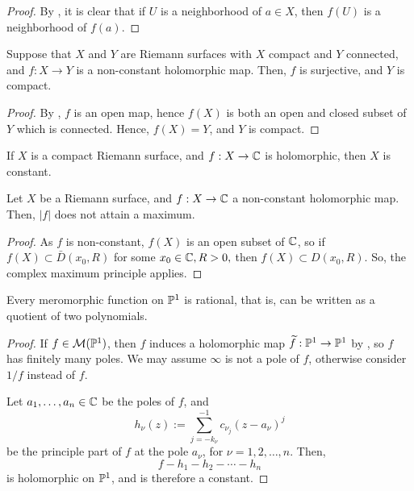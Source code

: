 \documentclass[11pt]{article}
\begin{document}
\begin{proof}
    By , it is clear that if $U$ is a neighborhood of $a \in X$, then $f(U)$ is a neighborhood of $f(a)$.
\end{proof}

\begin{thm}
    Suppose that $X$ and $Y$ are Riemann surfaces with $X$ compact and $Y$ connected, and $f:X \to Y$ is a non-constant holomorphic map. Then, $f$ is surjective, and $Y$ is compact.
\end{thm}

\begin{proof}
    By , $f$ is an open map, hence $f(X)$ is both an open and closed subset of $Y$ which is connected. Hence, $f(X) =Y$, and $Y$ is compact. 
\end{proof}

\begin{cor}[][label=cor:compact_hol_constant]
    If $X$ is a compact Riemann surface, and $f:X \to \C$ is holomorphic, then $X$ is constant.
\end{cor}

\begin{cor}
    Let $X$ be a Riemann surface, and $f:X \to \C$ a non-constant holomorphic map. Then, $|f|$ does not attain a maximum.
\end{cor}

\begin{proof}
    As $f$ is non-constant, $f(X)$ is an open subset of $\C$, so if $f(X) \subset \bar D(x_0,R)$ for some $x_0 \in \C,R>0,$ then $f(X) \subset D(x_0,R)$. So, the complex maximum principle applies.
\end{proof}

\begin{cor}
    Every meromorphic function on $\P^1$ is rational, that is, can be written as a quotient of two polynomials.
\end{cor}

\begin{proof}
    If $f \in \mc M(\P^1)$, then $f$ induces a holomorphic map $\tilde f:\P^1 \to \P^1$ by , so $f$ has finitely many poles. We may assume $\infty$ is not a pole of $f$, otherwise consider $1/f$ instead of $f$.

    Let $a_1,\dots,a_n \in \C$ be the poles of $f$, and 
    $$h_\nu(z) := \sum_{j=-k_\nu}^{-1}c_{\nu_j}(z-a_\nu)^j$$
    be the principle part of $f$ at the pole $a_\nu$, for $\nu=1,2,\dots,n$. Then,
    $$f-h_1-h_2 - \cdots - h_n$$
    is holomorphic on $\P^1$, and is therefore a constant.
\end{proof}
\end{document}
